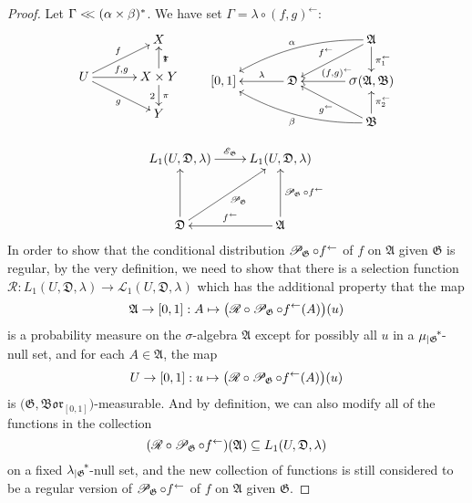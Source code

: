 \documentclass[
twoside=true,
paper=letter,
fontsize=9pt,
pagesize=auto,
leqno,
openany,
headsepline,
overfullrule,
]{scrbook}
\theoremstyle{plain}
\theoremstyle{plain}
\theoremstyle{definition}
\theoremstyle{bfnoteitalic}
\theoremstyle{bfnoteroman}
\newcommand{\sigalg}[1]{\mathfrak{#1}}
\newcommand{\cali}[1]{\mathscr{#1}}
\newcommand{\condexpop}[1]{\mathop{\cali{E}\hspace{-1pt}}\nolimits_{#1}}
\newcommand{\condprobop}[1]{\mathop{\cali{P}\hspace{-1pt}}\nolimits_{#1}}
\newcommand{\borel}{\mathfrak{Bor}}
\newcommand{\sagb}{\mathop{\hbox{\large{$\sigma$}}}\nolimits}
\newcommand{\textsigma}{\hbox{\large{$\sigma$}}\kern-1pt}
\newcommand{\restrictedto}[1]{_{\lvert#1}\kern-1.5pt}
\newcommand{\preimage}[1]{#1^{\leftarrow}}
\newcommand{\sigmaalgebra}{\sigalg{A}}
\newcommand{\sigmaalgebraii}{\sigalg{B}}
\newcommand{\productsig}[2]{\sagb(#1,#2)}
\newcommand{\kernast}{\ast\kern-1pt}
\newcommand{\funcf}{f}
\newcommand{\funcg}{g}
\newcommand{\function}{f}
\newcommand{\measurespace}{X}
\newcommand{\measurespaceii}{Y}
\newcommand{\abscont}{\mathrel{< \kern-3.5pt <}}
\newcommand{\measure}{\mu}
\newcommand{\measlambda}{\lambda}
\newcommand{\seti}{A}
\newcommand{\regular}{\cali{R}}
\newcommand{\projectionone}{\pi_1}
\newcommand{\projectiontwo}{\pi_2}
\newcommand{\uspace}{U}%
\newcommand{\uspaceelt}{u}
\newcommand{\uspacesig}{\sigalg{D}}
\newcommand{\joint}{\Gamma}%
\newcommand{\marginalone}{\alpha}%
\newcommand{\marginaltwo}{\beta}%
\begin{document}
\begin{proof}
Let $\joint \abscont (\marginalone\times\marginaltwo)^*$.
We have set
$\joint = \measlambda\circ\preimage{({\funcf,\funcg})}$:
\[
\xymatrix@R=16pt@C=34pt{
 & \measurespace
 \\
 \uspace
 \ar[ur]^{\funcf}
 \ar[dr]_{\funcg}
 \ar[r]^{\funcf, \funcg} &
 \measurespace \times \measurespaceii  \ar[u]_\projectionone \ar[d]^\projectiontwo
 \\
 & \measurespaceii  \\
}
\qquad
\xymatrix@R=18pt@C=34pt{
 & & \sigmaalgebra
 \ar[dl]_{\preimage{\funcf}}
 \ar[d]^{\preimage{\projectionone}}
 \ar@/_10pt/[lld]_{\marginalone}
 \\
 [0,1] & \uspacesig \ar[l]_-{\measlambda} &
 \productsig{\sigmaalgebra}{\sigmaalgebraii}
 \ar[l]_{\hskip8pt \preimage{(\funcf,\funcg)}}
 \\
 & & \sigmaalgebraii
  \ar[u]_{\preimage{\projectiontwo}}
  \ar[ul]^{\preimage{\funcg}}
  \ar@/^10pt/[llu]^{\marginaltwo}
  \\
}
\]


\[%
\xymatrix@R=16pt@C=24pt{
L_1(\uspace, \uspacesig, \measlambda) \ar[r]^{\condexpop{\sigalg{G}}}
& L_1(\uspace, \uspacesig, \measlambda)
\\
&
\\
\uspacesig \ar[uu] \ar[uur]_{ \condprobop{\sigalg{G}} }
& \sigmaalgebra
\ar[uu]_{ \condprobop{\sigalg{G}} \circ \preimage{\function} }
\ar[l]_{\preimage{\funcf}}
\\
}
\]
In order to show that the conditional distribution
$\condprobop{\sigalg{G}}\circ \preimage{\funcf}$ of $\funcf$ on $\sigmaalgebra$ given $\sigalg{G}$ is regular, by the very definition, we need to show that there is a selection function
$\regular:
L_1(\uspace,\uspacesig,\measlambda)
\to
\cali{L}_1(\uspace,\uspacesig,\measlambda) $
which has the additional property that the map
\[
\sigmaalgebra\to [0,1]: \seti \mapsto
\bigl( \regular\circ\condprobop{\sigalg{G}} \circ\preimage{\function}
(\seti)\bigr)(\uspaceelt)
\]
is a probability measure on the \textsigma\hyp{}algebra $\sigmaalgebra$ except for possibly all
$\uspaceelt$ in a
${\measure\restrictedto{\sigalg{G}}}^\kernast$-null set,
and for each
$\seti\in\sigmaalgebra$, the map
\[
\uspace\to [0,1] : \uspaceelt\mapsto
\bigl( \regular\circ\condprobop{\sigalg{G}}\circ\preimage{\function}
(\seti)\bigr)(\uspaceelt)
\]
is $\bigl(\sigalg{G}, \borel_{[0,1]}\bigr)$\hyp{}measurable.
And by definition, we can also modify all of the functions in the collection
\[
(\regular\circ\condprobop{\sigalg{G}}\circ\preimage{\function})
(\sigmaalgebra)
\subseteq
L_1(\uspace,\uspacesig,\measlambda)
\]
on a fixed
${ \measlambda\restrictedto{\sigalg{G}} }^\kernast$\hyp{}null set,
and the new collection of functions is still considered to be a
regular version of
$\condprobop{\sigalg{G}}\circ\preimage{\function}$
of $\function$
on $\sigmaalgebra$ given $\sigalg{G}$.


\end{proof}
\end{document}
